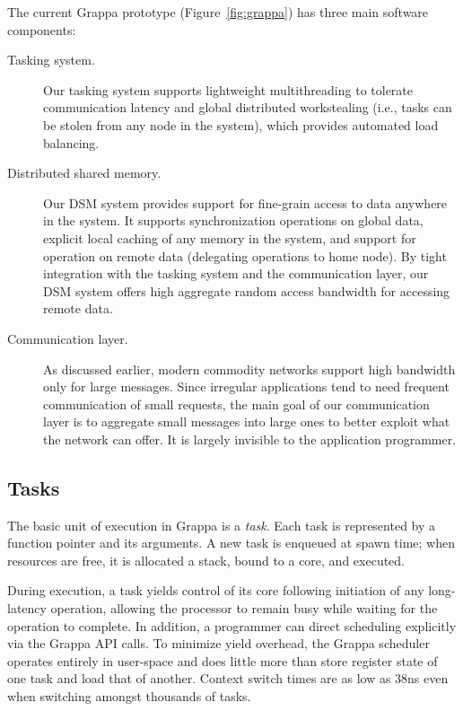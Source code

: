 The current Grappa prototype (Figure~\ref{fig:grappa}) has three main software components: \begin{description}

\item [Tasking system.] Our tasking system supports lightweight multithreading to tolerate communication latency and global distributed workstealing (i.e., tasks can be stolen from any node in the system), which provides automated load balancing.

\item[Distributed shared memory.] Our DSM system provides support for fine-grain access to data anywhere in the system. It supports synchronization operations on global data, explicit local caching of any memory in the system, and support for operation on remote data (delegating operations to home node). By tight integration with the tasking system and the communication layer, our DSM system offers high aggregate random access bandwidth for accessing remote data.

\item[Communication layer.] As discussed earlier, modern commodity networks support high bandwidth only for large messages. Since irregular applications tend to need frequent communication of small requests, the main goal of our communication layer is to aggregate small messages into large ones to better exploit what the network can offer. It is largely invisible to the application programmer.

\end{description}

\subsection{Tasks}

The basic unit of execution in Grappa is a {\em task}. Each task is represented by a function pointer and its arguments. A new task is enqueued at spawn time; when resources are free, it is allocated a stack, bound to a core, and executed.

During execution, a task yields control of its core following initiation of any long-latency operation, allowing the processor to remain busy while waiting for the operation to complete.  In addition,  a programmer can direct scheduling explicitly via the Grappa API calls. To minimize yield overhead, the Grappa scheduler operates entirely in user-space and does little more than store register state of one task and load that of another. Context switch times are as low as 38ns even when switching amongst thousands of tasks.

